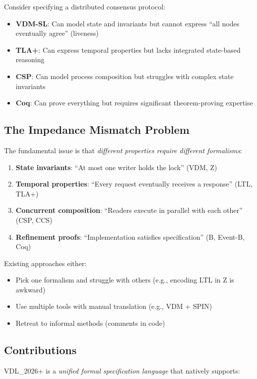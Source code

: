 \documentclass[conference]{IEEEtran}
\begin{document}
Consider specifying a distributed consensus protocol:
\begin{itemize}
\item \textbf{VDM-SL}: Can model state and invariants but cannot express ``all nodes eventually agree'' (liveness)
\item \textbf{TLA+}: Can express temporal properties but lacks integrated state-based reasoning
\item \textbf{CSP}: Can model process composition but struggles with complex state invariants
\item \textbf{Coq}: Can prove everything but requires significant theorem-proving expertise
\end{itemize}

\subsection{The Impedance Mismatch Problem}

The fundamental issue is that \textit{different properties require different formalisms}:

\begin{enumerate}
\item \textbf{State invariants}: ``At most one writer holds the lock'' (VDM, Z)
\item \textbf{Temporal properties}: ``Every request eventually receives a response'' (LTL, TLA+)
\item \textbf{Concurrent composition}: ``Readers execute in parallel with each other'' (CSP, CCS)
\item \textbf{Refinement proofs}: ``Implementation satisfies specification'' (B, Event-B, Coq)
\end{enumerate}

Existing approaches either:
\begin{itemize}
\item Pick one formalism and struggle with others (e.g., encoding LTL in Z is awkward)
\item Use multiple tools with manual translation (e.g., VDM + SPIN)
\item Retreat to informal methods (comments in code)
\end{itemize}

\subsection{Contributions}

VDL\_2026+ is a \textit{unified formal specification language} that natively supports:
\end{document}
